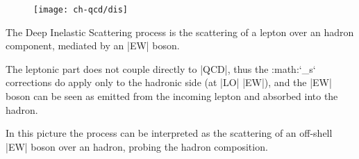 \begin{figure}
	\centering
	\texttt{[image: ch-qcd/dis]}
\end{figure}

The Deep Inelastic Scattering process is the scattering of a lepton over an
hadron component, mediated by an |EW| boson.

The leptonic part does not couple directly to |QCD|, thus the :math:`\alpha_s`
corrections do apply only to the hadronic side (at |LO| |EW|), and the |EW|
boson can be seen as emitted from the incoming lepton and absorbed into the
hadron.

In this picture the process can be interpreted as the scattering of an off-shell
|EW| boson over an hadron, probing the hadron composition.
